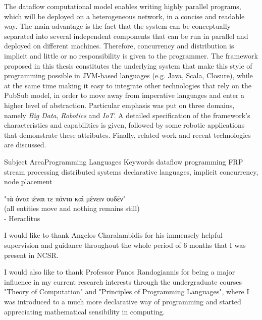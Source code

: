 \documentclass{dithesis}
\begin{document}


\maketitle

\begin{thesisabstract}[Abstract]

The dataflow computational model enables writing highly parallel programs, which will be deployed on a heterogeneous network, in a concise and readable way. The main advantage is the fact that the system can be conceptually separated into several independent components that can be run in parallel and deployed on different machines. Therefore, concurrency and distribution is implicit and little or no responsibility is given to the programmer. The framework proposed in this thesis constitutes the underlying system that make this style of programming possible in JVM-based languages (e.g. Java, Scala, Closure), while at the same time making it easy to integrate other technologies that rely on the PubSub model, in order to move away from imperative languages and enter a higher level of abstraction. Particular emphasis was put on three domains, namely \textit{Big Data}, \textit{Robotics} and \textit{IoT}. A detailed specification of the framework's characteristics and capabilities is given, followed by some robotic applications that demonstrate these attributes. Finally, related work and recent technologies are discussed.

\thesiskeywords
{Subject Area}{Programming Languages}
{Keywords}
	{dataflow programming}
	{FRP}
	{stream processing}
	{distributed systems}
	{declarative languages, implicit concurrency, node placement}
\end{thesisabstract}

\begin{thesisdedication}
"τὰ όντα ιέναι τε πάντα καὶ μένειν ουδέν" \\
(all entities move and nothing remains still) \\
- Heraclitus
\end{thesisdedication}

\begin{thesisacknowledgments}[Acknowledgements]

I would like to thank Angelos Charalambidis for his immensely helpful supervision and guidance throughout the whole period of 6 months that I was present in NCSR. 

I would also like to thank Professor Panos Randogiannis for being a major influence in my current research interests through the undergraduate courses "Theory of Computation" and "Principles of Programming Languages", where I was introduced to a much more declarative way of programming and started appreciating mathematical sensibility in computing.

\end{thesisacknowledgments}
\end{document}

